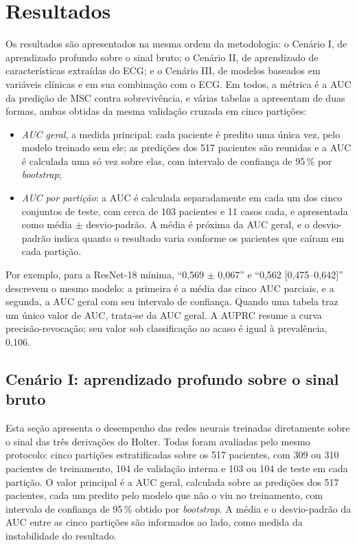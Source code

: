 \chapter{Resultados}
\label{chap:resultados}
\label{cap:resultados}

Os resultados são apresentados na mesma ordem da metodologia: o Cenário I,
de aprendizado profundo sobre o sinal bruto; o Cenário II, de aprendizado
de características extraídas do \gls{ECG}; e o Cenário III, de modelos
baseados em variáveis clínicas e em sua combinação com o \gls{ECG}. Em
todos, a métrica é a \gls{AUC} da predição de \gls{MSC} contra
sobrevivência, e várias tabelas a apresentam de duas formas, ambas obtidas
da mesma validação cruzada em cinco partições:

\begin{itemize}
	\item \textit{\gls{AUC} geral}, a medida principal: cada paciente é
	predito uma única vez, pelo modelo treinado sem ele; as predições dos
	517 pacientes são reunidas e a \gls{AUC} é calculada uma só vez sobre
	elas, com intervalo de confiança de 95\,\% por \textit{bootstrap};
	\item \textit{\gls{AUC} por partição}: a \gls{AUC} é calculada
	separadamente em cada um dos cinco conjuntos de teste, com cerca de 103
	pacientes e 11 casos cada, e apresentada como média $\pm$
	desvio-padrão. A média é próxima da \gls{AUC} geral, e o desvio-padrão
	indica quanto o resultado varia conforme os pacientes que caíram em cada
	partição.
\end{itemize}

\noindent
Por exemplo, para a ResNet-18 mínima, ``0,569 $\pm$ 0,067'' e ``0,562 [0,475--0,642]'' descrevem o
mesmo modelo: a primeira é a média das cinco \gls{AUC} parciais, e a
segunda, a \gls{AUC} geral com seu intervalo de confiança. Quando uma
tabela traz um único valor de \gls{AUC}, trata-se da \gls{AUC} geral. A \gls{AUPRC} resume a curva
precisão-revocação; seu valor sob classificação ao acaso é igual à
prevalência, 0,106.


\section{Cenário I: aprendizado profundo sobre o sinal bruto}
\label{sec:res-cenario1}
\label{sec:res-redes}

Esta seção apresenta o desempenho das redes neurais treinadas diretamente
sobre o sinal das três derivações do Holter. Todas foram avaliadas pelo mesmo
protocolo: cinco partições estratificadas sobre os 517 pacientes, com 309 ou
310 pacientes de treinamento, 104 de validação interna e 103 ou 104 de teste
em cada partição. O valor principal é a \gls{AUC} geral,
calculada sobre as predições dos 517 pacientes, cada um predito pelo modelo
que não o viu no treinamento, com intervalo de confiança de 95\,\% obtido por
\textit{bootstrap}. A média e o desvio-padrão da \gls{AUC} entre as cinco
partições são informados ao lado, como medida da instabilidade do resultado.

